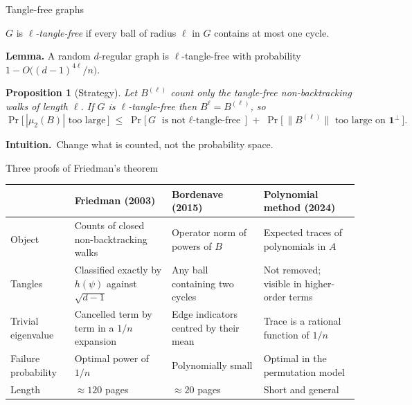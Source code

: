\documentclass[aspectratio=169,10pt]{beamer}
\newtheorem{proposition}[theorem]{Proposition}
\newcommand{\one}{\mathbf{1}}
\newcommand{\intuition}{{\color{accent}\textbf{Intuition.}}\ }
\begin{document}
\begin{frame}{Tangle-free graphs}
  \begin{definition}[Bordenave]
    $G$ is \emph{$\ell$-tangle-free} if every ball of radius $\ell$ in $G$ contains at most one cycle.
  \end{definition}
  \textbf{Lemma.} A random $d$-regular graph is $\ell$-tangle-free with probability $1-O\bigl((d-1)^{4\ell}/n\bigr)$.
  \begin{proposition}[Strategy]
    Let $B^{(\ell)}$ count only the tangle-free non-backtracking walks of length $\ell$.
    If $G$ is $\ell$-tangle-free then $B^{\ell}=B^{(\ell)}$, so
    \[
      \Pr\bigl[\,|\mu_2(B)|\text{ too large}\,\bigr]\;\le\;
      \Pr\bigl[\,G\text{ is not $\ell$-tangle-free}\,\bigr]\;+\;\Pr\bigl[\,\lVert B^{(\ell)}\rVert\text{ too large on }\one^{\perp}\,\bigr].
    \]
    \vspace{-5mm}
  \end{proposition}
  \vspace{-1mm}
  \intuition Change what is counted, not the probability space.
\end{frame}

\begin{frame}{Three proofs of Friedman's theorem}
  \small
  \begin{center}
  \begin{tabular}{@{}L{0.16\textwidth}L{0.25\textwidth}L{0.25\textwidth}L{0.25\textwidth}@{}}
    \toprule
    & \textbf{Friedman} (2003) & \textbf{Bordenave} (2015) & \textbf{Polynomial method} (2024)\\
    \midrule
    Object & Counts of closed non-backtracking walks & Operator norm of powers of $B$ & Expected traces of polynomials in $A$\\
    \addlinespace
    Tangles & Classified exactly by $h(\psi)$ against $\sqrt{d-1}$ & Any ball containing two cycles & Not removed; visible in higher-order terms\\
    \addlinespace
    Trivial eigenvalue & Cancelled term by term in a $1/n$ expansion & Edge indicators centred by their mean & Trace is a rational function of $1/n$\\
    \addlinespace
    Failure probability & Optimal power of $1/n$ & Polynomially small & Optimal in the permutation model\\
    \addlinespace
    Length & $\approx120$ pages & $\approx20$ pages & Short and general\\
    \bottomrule
  \end{tabular}
  \end{center}
\end{frame}
\end{document}
